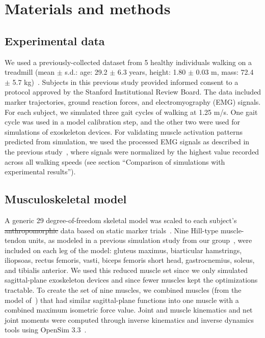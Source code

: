 \documentclass[10pt,letterpaper]{article}
\providecommand{\DIFdeltex}[1]{{\protect\color{red}\sout{#1}}}                      %
\providecommand{\DIFdelbegin}{} %
\providecommand{\DIFdelend}{} %
\providecommand{\DIFdel}[1]{\texorpdfstring{\DIFdeltex{#1}}{}} %
\newcommand{\DIFscaledelfig}{0.5}
\newlength{\DIFdelgraphicswidth} %
\newlength{\DIFdelgraphicsheight} %
\newcommand{\DIFdelincludegraphics}[2][]{%
\sbox{\DIFdelgraphicsbox}{\DIFOincludegraphics[#1]{#2}}%
\settoboxwidth{\DIFdelgraphicswidth}{\DIFdelgraphicsbox} %
\settoboxtotalheight{\DIFdelgraphicsheight}{\DIFdelgraphicsbox} %
\scalebox{\DIFscaledelfig}{%
\parbox[b]{\DIFdelgraphicswidth}{\usebox{\DIFdelgraphicsbox}\\[-\baselineskip] \rule{\DIFdelgraphicswidth}{0em}}\llap{\resizebox{\DIFdelgraphicswidth}{\DIFdelgraphicsheight}{%
\setlength{\unitlength}{\DIFdelgraphicswidth}%
\begin{picture}(1,1)%
\thicklines\linethickness{2pt} %
{\color[rgb]{1,0,0}\put(0,0){\framebox(1,1){}}}%
{\color[rgb]{1,0,0}\put(0,0){\line( 1,1){1}}}%
{\color[rgb]{1,0,0}\put(0,1){\line(1,-1){1}}}%
\end{picture}%
}\hspace*{3pt}}} %
} %
\DeclareRobustCommand{\DIFdelbegin}{\DIFOdelbegin \let\includegraphics\DIFdelincludegraphics} %
\DeclareRobustCommand{\DIFdelend}{\DIFOaddend \let\includegraphics\DIFOincludegraphics} %
\begin{document}
\section*{Materials and methods}

\subsection*{Experimental data}
We used a previously-collected dataset from 5 healthy individuals walking on a treadmill (mean $\pm$ s.d.: age: 29.2 $\pm$ 6.3 years, height: 1.80 $\pm$ 0.03 m, mass: 72.4 $\pm$ 5.7 kg)~\cite{Arnold:2013}. Subjects in this previous study provided informed consent to a protocol approved by the Stanford Institutional Review Board. The data included marker trajectories, ground reaction forces, and electromyography (EMG) signals. For each subject, we simulated three gait cycles of walking at 1.25 m/s. One gait cycle was used in a model calibration step, and the other two were used for simulations of exoskeleton devices. For validating muscle activation patterns predicted from simulation, we used the processed EMG signals as described in the previous study~\cite{Arnold:2013}, where signals were normalized by the highest value recorded across all walking speeds (see section ``Comparison of simulations with experimental results''). 

\subsection*{Musculoskeletal model}
A generic 29 degree-of-freedom skeletal model was scaled to each subject’s \DIFdelbegin \DIFdel{anthropomorphic }\DIFdelend data based on static marker trials~\cite{Rajagopal:2016}. Nine Hill-type muscle-tendon units, as modeled in a previous simulation study from our group~\cite{Ong:2019}, were included on each leg of the model: gluteus maximus, biarticular hamstrings, iliopsoas, rectus femoris, vasti, biceps femoris short head, gastrocnemius, soleus, and tibialis anterior. We used this reduced muscle set since we only simulated sagittal-plane exoskeleton devices and since fewer muscles kept the optimizations tractable. To create the set of nine muscles, we combined muscles (from the model of~\cite{Rajagopal:2016}) that had similar sagittal-plane functions into one muscle with a combined maximum isometric force value. Joint and muscle kinematics and net joint moments were computed through inverse kinematics and inverse dynamics tools using OpenSim 3.3~\cite{Delp:2007}.
\end{document}
